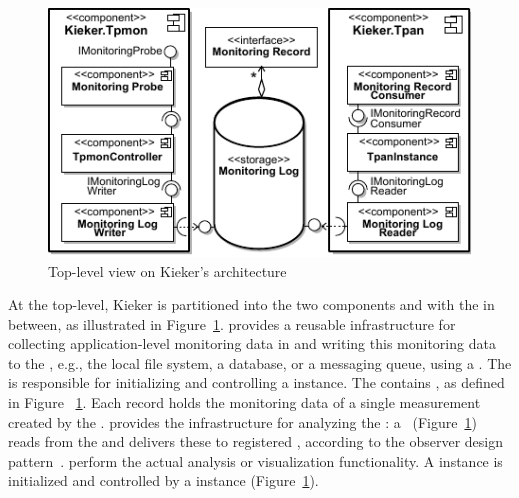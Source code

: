 \begin{figure}\centering
\includegraphics[width=1\columnwidth]{figures/kiekerComponentDiagram-woCloud-bw}%
\caption{Top-level view on Kieker's architecture}
\label{fig:kieker:coreFrameworkComponents}
\end{figure}

At the top-level, Kieker is partitioned into the two components \KiekerTpmon{} and %
\KiekerTpan{} with the \MonitoringLog{} in between, as illustrated in Figure~\ref{fig:kieker:coreFrameworkComponents}. %
\KiekerTpmon{} provides a reusable infrastructure for collecting %
application-level monitoring data in \MonitoringProbes{} and writing this %
monitoring data to the \MonitoringLog{}, e.g., the local file system, a database, or %
a messaging queue, using a \MonitoringLogWriter{}. %
The \TpmonController{} %
is responsible for initializing and controlling a \KiekerTpmon{} instance. %
The \MonitoringLog{} contains \MonitoringRecords{}, as defined in Figure~%
\ref{fig:kieker:coreFrameworkComponents}. %
Each record holds the %
monitoring data of a single measurement created by the \MonitoringProbes{}. %
\KiekerTpan{} provides the infrastructure for analyzing the \MonitoringLog{}: %
a \MonitoringLogReader{}~(Figure~\ref{fig:kieker:coreFrameworkComponents}) reads \MonitoringRecords{} from the %
\MonitoringLog{} and delivers these to registered \MonitoringRecordConsumers{}, according to the observer design pattern~\citep{GammaHelmJohnsonVlissides1995DesignPatternsElementsOfReusableObjectOrientedSoftware}. %
\MonitoringRecordConsumers{} perform the actual analysis or visualization functionality. %
A \KiekerTpan{} instance is initialized and controlled by a \TpanInstance{} %
instance (Figure~\ref{fig:kieker:coreFrameworkComponents}). %

